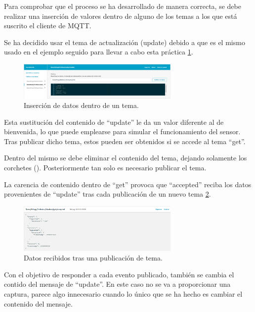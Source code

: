 \documentclass[english,runningheads,a4paper]{llncs}[2018/03/10]
\begin{document}
Para comprobar que el proceso se ha desarrollado de manera correcta, se debe
realizar una inserción de valores dentro de alguno de los temas a los que está
suscrito el cliente de MQTT. 

Se ha decidido usar el tema de actualización (update) debido a que es el mismo
usado en el ejemplo seguido para llevar a cabo esta práctica
\hyperref[insertion]{\ref{insertion}}.

\begin{figure}[h!]
 \centering
 \includegraphics[width=0.7\textwidth]{./IoT/AWS/3-2_insertion.png}
 \caption{Inserción de datos dentro de un tema.}
 \label{insertion}
\end{figure}

Esta sustitución del contenido de ``update'' le da un valor diferente al de
bienvenida, lo que puede emplearse para simular el funcionamiento del sensor.
Tras publicar dicho tema, estos pueden ser obtenidos si se accede al tema
``get''. 

Dentro del mismo se debe eliminar el contenido del tema, dejando solamente los
corchetes ({}). Posteriormente tan solo es necesario publicar el tema.

La carencia de contenido dentro de ``get'' provoca que ``accepted'' reciba los
datos provenientes de ``update'' tras cada publicación de un nuevo tema
\hyperref[accepted]{\ref{accepted}}.

\begin{figure}[h!]
 \centering
 \includegraphics[width=0.7\textwidth]{./IoT/AWS/3-3_accepted.png}
 \caption{Datos recibidos tras una publicación de tema.}
 \label{accepted}
\end{figure}

Con el objetivo de responder a cada evento publicado, también se cambia el
contido del mensaje de ``update''. En este caso no se va a proporcionar una
captura, parece algo innecesario cuando lo único que se ha hecho es cambiar el
contenido del mensaje.
\end{document}
